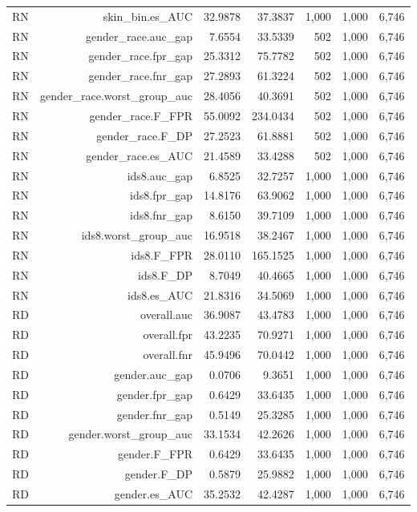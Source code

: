 \documentclass[10pt]{article}
\begin{document}
\begin{longtable}{@{}lrrrrrr@{}}
RN & skin\_bin.es\_AUC & 32.9878 & 37.3837 & 1,000 & 1,000 & 6,746 \\
RN & gender\_race.auc\_gap & 7.6554 & 33.5339 & 502 & 1,000 & 6,746 \\
RN & gender\_race.fpr\_gap & 25.3312 & 75.7782 & 502 & 1,000 & 6,746 \\
RN & gender\_race.fnr\_gap & 27.2893 & 61.3224 & 502 & 1,000 & 6,746 \\
RN & gender\_race.worst\_group\_auc & 28.4056 & 40.3691 & 502 & 1,000 & 6,746 \\
RN & gender\_race.F\_FPR & 55.0092 & 234.0434 & 502 & 1,000 & 6,746 \\
RN & gender\_race.F\_DP & 27.2523 & 61.8881 & 502 & 1,000 & 6,746 \\
RN & gender\_race.es\_AUC & 21.4589 & 33.4288 & 502 & 1,000 & 6,746 \\
RN & ids8.auc\_gap & 6.8525 & 32.7257 & 1,000 & 1,000 & 6,746 \\
RN & ids8.fpr\_gap & 14.8176 & 63.9062 & 1,000 & 1,000 & 6,746 \\
RN & ids8.fnr\_gap & 8.6150 & 39.7109 & 1,000 & 1,000 & 6,746 \\
RN & ids8.worst\_group\_auc & 16.9518 & 38.2467 & 1,000 & 1,000 & 6,746 \\
RN & ids8.F\_FPR & 28.0110 & 165.1525 & 1,000 & 1,000 & 6,746 \\
RN & ids8.F\_DP & 8.7049 & 40.4665 & 1,000 & 1,000 & 6,746 \\
RN & ids8.es\_AUC & 21.8316 & 34.5069 & 1,000 & 1,000 & 6,746 \\
RD & overall.auc & 36.9087 & 43.4783 & 1,000 & 1,000 & 6,746 \\
RD & overall.fpr & 43.2235 & 70.9271 & 1,000 & 1,000 & 6,746 \\
RD & overall.fnr & 45.9496 & 70.0442 & 1,000 & 1,000 & 6,746 \\
RD & gender.auc\_gap & 0.0706 & 9.3651 & 1,000 & 1,000 & 6,746 \\
RD & gender.fpr\_gap & 0.6429 & 33.6435 & 1,000 & 1,000 & 6,746 \\
RD & gender.fnr\_gap & 0.5149 & 25.3285 & 1,000 & 1,000 & 6,746 \\
RD & gender.worst\_group\_auc & 33.1534 & 42.2626 & 1,000 & 1,000 & 6,746 \\
RD & gender.F\_FPR & 0.6429 & 33.6435 & 1,000 & 1,000 & 6,746 \\
RD & gender.F\_DP & 0.5879 & 25.9882 & 1,000 & 1,000 & 6,746 \\
RD & gender.es\_AUC & 35.2532 & 42.4287 & 1,000 & 1,000 & 6,746 \\

\end{longtable}
\end{document}

